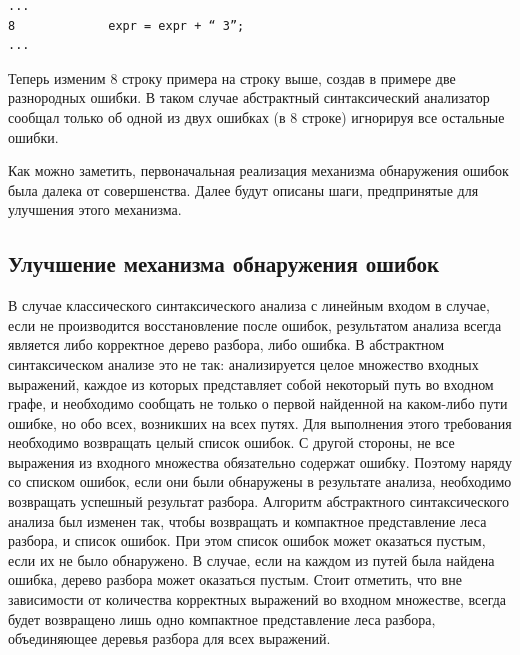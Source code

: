 \begin{verbatim}
...
8             expr = expr + “ 3”;
...
\end{verbatim}
Теперь изменим 8 строку примера на строку выше, создав в примере две разнородных 
ошибки. В таком случае абстрактный синтаксический анализатор сообщал только об 
одной из двух ошибках (в 8 строке) игнорируя все остальные ошибки.

Как можно заметить, первоначальная реализация механизма обнаружения ошибок была 
далека от совершенства. Далее будут описаны шаги, предпринятые для улучшения этого 
механизма. 

\subsection{Улучшение механизма обнаружения ошибок}
В случае классического синтаксического анализа с линейным входом в случае, если 
не производится восстановление после ошибок, результатом анализа всегда является 
либо корректное дерево разбора, либо ошибка. В абстрактном синтаксическом анализе 
это не так: анализируется целое множество входных выражений, каждое из которых 
представляет собой некоторый путь во входном графе, и необходимо сообщать не только 
о первой найденной на каком-либо пути ошибке, но обо всех, возникших на всех путях. 
Для выполнения этого требования необходимо возвращать целый список ошибок. С другой 
стороны, не все выражения из входного множества обязательно содержат ошибку. 
Поэтому наряду со списком ошибок, если они были обнаружены в результате анализа, 
необходимо возвращать успешный результат разбора. Алгоритм абстрактного синтаксического 
анализа был изменен так, чтобы возвращать и компактное представление леса разбора, 
и список ошибок. При этом список ошибок может оказаться пустым, если их не было 
обнаружено. В случае, если на каждом из путей была найдена ошибка, дерево разбора 
может оказаться пустым. Стоит отметить, что вне зависимости от количества корректных 
выражений во входном множестве, всегда будет возвращено лишь одно компактное 
представление леса разбора, объединяющее деревья разбора для всех выражений.

